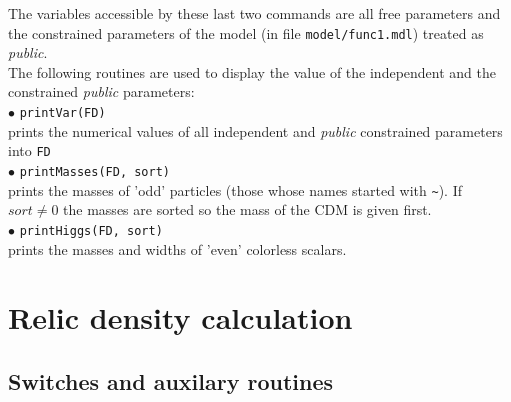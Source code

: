 \documentclass[12pt,a4paper]{article}
\begin{document}
\noindent
The variables accessible by these last two commands are all free parameters and   the 
constrained parameters of the model (in file \verb|model/func1.mdl|)
treated as {\it public}. \\


The following routines are used to display the value of the independent and the constrained 
{\it public} parameters:\\[2mm]
% 
$\bullet$ \verb|printVar(FD)|\\ 
prints the numerical values of all independent and {\it public} 
constrained parameters into \verb|FD|\\[2mm]
%
$\bullet$ \verb|printMasses(FD, sort)|\\
 prints the masses of 'odd' particles
(those whose names  started with \verb|~|). If $sort\ne 0$
the masses are sorted so the mass of the CDM is given first.\\[2mm]
%
$\bullet$ \verb|printHiggs(FD, sort)|\\
prints the masses and widths of 'even' colorless scalars.


\section{Relic density calculation}
\subsection{Switches and auxilary routines}
\end{document}
